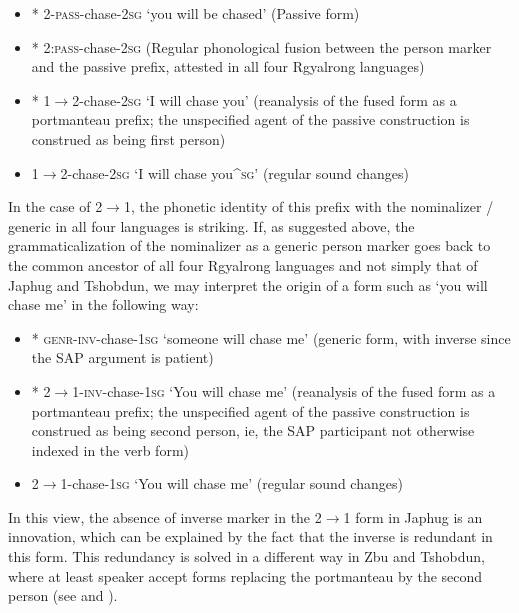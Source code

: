 \begin{itemize}
\item *  2-\textsc{pass}-chase-\textsc{2sg} `you will be chased' (Passive form)
\item *  2:\textsc{pass}-chase-\textsc{2sg} (Regular phonological fusion between the person marker and the passive prefix, attested in all four Rgyalrong languages)  
\item  *  1$\rightarrow$2-chase-\textsc{2sg} `I will chase you' (reanalysis of the fused form as a portmanteau prefix; the unspecified agent of the passive construction is construed as being first person)
\item  {} 1$\rightarrow$2-chase-\textsc{2sg} `I will chase you^{\textsc{sg}}' (regular sound changes)
\end{itemize}


In the case of 2$\rightarrow$1, the phonetic identity of this prefix with the nominalizer / generic in all four languages is striking. If, as suggested above, the grammaticalization of the nominalizer  as a generic person marker goes back to the common ancestor of all four Rgyalrong languages and not simply that of Japhug and Tshobdun, we may interpret the origin of a form such as  `you will chase me' in the following way:


\begin{itemize}
\item *  \textsc{genr}-\textsc{inv}-chase-\textsc{1sg} `someone will chase me' (generic form, with inverse since the SAP argument is patient)
\item  *  2$\rightarrow$1-\textsc{inv}-chase-\textsc{1sg} `You will chase me' (reanalysis of the fused form as a portmanteau prefix; the unspecified agent of the passive construction is construed as being second person, ie, the SAP participant not otherwise indexed in the verb form)
\item  {} 2$\rightarrow$1-chase-\textsc{1sg} `You will chase me'  (regular sound changes)
\end{itemize}

In this view, the absence of inverse marker in the  2$\rightarrow$1 form in Japhug is an innovation, which can be explained by the fact that the inverse is redundant in this form. This redundancy is solved in a different way in Zbu and Tshobdun, where at least speaker accept forms replacing the portmanteau  by the second person  (see \citealt{jackson02rentongdengdi} and \citealt{gongxun14agreement}).
 
